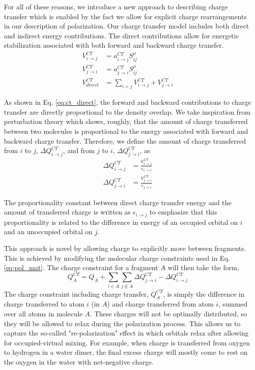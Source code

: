 \documentclass[journal=jacsat,manuscript=article]{achemso}
\begin{document}
For all of these reasons, we introduce a new approach to describing charge transfer
which is enabled by the fact we allow for explicit charge rearrangements in our
description of polarization. Our charge transfer model includes both direct and
indirect energy contributions. The direct contributions allow for energetic stabilization
associated with both forward and backward charge transfer.
\begin{align}
  V^{CT}_{i\rightarrow j}&=a_{i\rightarrow j}^{CT}S_{ij}^\rho\\
  V^{CT}_{j\rightarrow i}&=a_{j\rightarrow i}^{CT}S_{ij}^\rho\\
  V^{CT}_{direct}&=\sum_{i<j}V^{CT}_{i\rightarrow j}+V^{CT}_{j\rightarrow i}
  \label{eq:ct_direct}
\end{align}

As shown in Eq. \ref{eq:ct_direct}, the forward and backward contributions to
charge transfer are directly proportional to the density overlap.
We take inspiration from perturbation theory which shows, roughly, that
the amount of charge transferred between two molecules is proportional to the
energy associated with forward and backward charge transfer.\cite{khaliullin2007unravelling,khaliullin2008analysis,khaliullin2009electron}
Therefore, we define the amount of charge transferred from $i$ to $j$, $\Delta Q^{CT}_{i\rightarrow j}$,
and from $j$ to $i$, $\Delta Q^{CT}_{j\rightarrow i}$, as
\begin{align}
  \Delta Q^{CT}_{i\rightarrow j}&=\frac{V^{CT}_{i\rightarrow j}}{\epsilon_{i\rightarrow j}}\\
  \Delta Q^{CT}_{j\rightarrow i}&=\frac{V^{CT}_{j\rightarrow i}}{\epsilon_{j\rightarrow i}}
\end{align}

The proportionality constant between direct charge transfer
energy and the amount of transferred charge is written as $\epsilon_{i\rightarrow j}$
to emphasize that this proportionality is related to the difference in energy
of an occupied orbital on $i$ and an unoccupied orbital on $j$.\cite{khaliullin2007unravelling}

This approach is novel by allowing charge to explicitly move between
fragments. This is achieved by modifying the molecular charge constraints used in Eq. \ref{eq:pol_mat}.
The charge constraint for a fragment $A$ will then take the form,
\begin{equation}
  Q^{CT}_A=Q_A+\sum_{i\in A}\sum_{j\notin A}\Delta Q^{CT}_{j\rightarrow i}-\Delta Q^{CT}_{i\rightarrow j}
  \label{eq:charge_constraint}
\end{equation}
The charge constraint including charge transfer, $Q^{CT}_A$, is simply the
difference in charge transferred to atom $i$ (in $A$) and charge transferred from atom
$i$, summed over all atoms in molecule $A$. These charges will not be optimally
distributed, so they will be allowed to relax during the polarization process.
This allows us to capture the so-called "re-polarization"\cite{khaliullin2007unravelling}
effect in which orbitals relax after allowing for occupied-virtual mixing.
For example, when charge is transferred from oxygen to hydrogen in a water
dimer, the final excess charge will mostly come to rest on the oxygen in
the water with net-negative charge.
\end{document}
